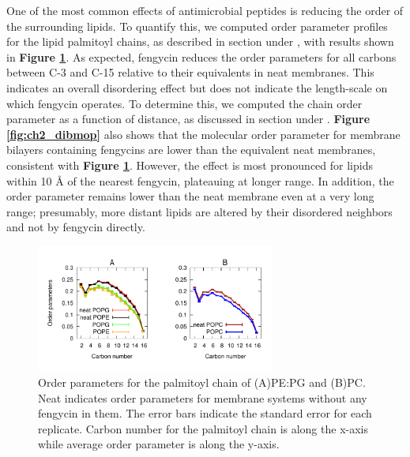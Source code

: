 \label{subsec:ch2_opara}

One of the most common effects of antimicrobial peptides is reducing the order
of the surrounding lipids.\cite{Seelig2004} To quantify this, we computed order parameter
profiles for the lipid palmitoyl chains, as described in section \textbf{
} under \textbf{}, with results shown in \textbf{Figure \ref{fig:ch2_ord_par}}.  As expected,
fengycin reduces the order parameters for all carbons between C-3 and C-15 relative
to their equivalents in neat membranes. This indicates an overall disordering effect
but does not indicate the length-scale on which fengycin operates.
To determine this, we computed the chain order parameter as a function of
distance, as discussed in section \textbf{} under \textbf{}.
 \textbf{Figure \ref{fig:ch2_dibmop}} also shows that the molecular order parameter for membrane bilayers containing
fengycins are lower than the equivalent neat membranes, consistent with \textbf{Figure
\ref{fig:ch2_ord_par}}.  However, the effect is most pronounced for lipids within 10
{\AA} of the nearest fengycin, plateauing at longer range. In addition, the order
parameter remains lower than the neat membrane even at a very long range;
presumably, more distant lipids are altered by their disordered neighbors and
not by fengycin directly.

\begin{figure}
\centering
\includegraphics[width=0.7\textwidth]{chapter2_figs/ord_par_corr.pdf}
\caption{\label{fig:ch2_ord_par} Order parameters for the palmitoyl chain of
(A)PE:PG and (B)PC. Neat indicates order parameters for membrane systems without
any fengycin in them. The error bars indicate the standard error for each
replicate. Carbon number for the palmitoyl chain is along the x-axis while
average order parameter is along the y-axis.}
\end{figure}

